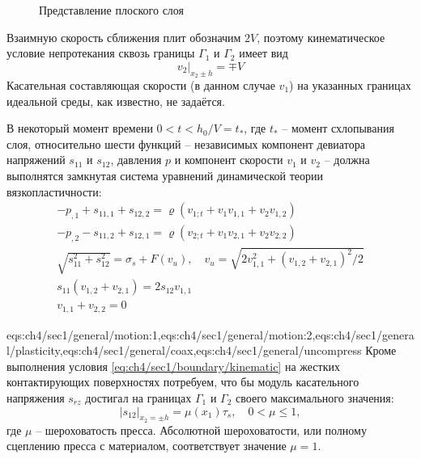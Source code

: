 \begin{figure}[ht]
  \caption{Представление плоского слоя}
  \label{fig:ch4/layer/circle}
\end{figure}
Взаимную скорость сближения плит обозначим $2V$, поэтому кинематическое условие непротекания сквозь границы $\Gamma_{1}$ и $\Gamma_{2}$ имеет вид
\begin{equation}
  \label{eq:ch4/sec1/boundary/kinematic}
  v_{2}\lvert_{x_2\pm h} = \mp V
\end{equation}
Касательная составляющая скорости (в данном случае $v_{1}$) на указанных границах идеальной среды, как известно, не задаётся.

В некоторый момент времени $0 < t < h_{0}/V = t_*$, где $t_*$ -- момент схлопывания слоя, относительно шести функций -- независимых компонент девиатора напряжений $s_{11}$ и $s_{12}$, давления $p$ и компонент скорости $v_{1}$ и $v_{2}$ -- должна выполнятся замкнутая система уравнений динамической теории вязкопластичности:
\begin{gather}
  \label{eqs:ch4/sec1/general/motion:1}
  -p_{,1}+s_{11,1}+s_{12,2} = \varrho \left(v_{1;t}+v_{1} v_{1,1} + v_{2} v_{1,2} \right)
  \\
  \label{eqs:ch4/sec1/general/motion:2}
  -p_{,2}-s_{11,2}+s_{12,1} = \varrho \left(v_{2;t}+v_{1} v_{2,1} + v_{2} v_{2,2} \right)
  \\
  \label{eqs:ch4/sec1/general/plasticity}
  \sqrt{s^2_{11}+s^2_{12}}=\sigma_{s} + F(v_{u}), \quad v_{u} = \sqrt{2 v^2_{1,1}+\left(v_{1,2}+v_{2,1}\right)^2 / 2}
  \\
  \label{eqs:ch4/sec1/general/coax}
  s_{11} \left(v_{1,2}+v_{2,1}\right) = 2 s_{12} v_{1,1}
  \\
  \label{eqs:ch4/sec1/general/uncompress}
  v_{1,1}+v_{2,2} = 0
\end{gather}

\expandafter\gdef\csname eqs:ch4/sec1/general\endcsname{eqs:ch4/sec1/general/motion:1,eqs:ch4/sec1/general/motion:2,eqs:ch4/sec1/general/plasticity,eqs:ch4/sec1/general/coax,eqs:ch4/sec1/general/uncompress}
Кроме выполнения условия \cref{eq:ch4/sec1/boundary/kinematic} на жестких контактирующих поверхностях потребуем, что бы модуль касательного напряжения $s_{rz}$ достигал на границах $\Gamma_{1}$ и $\Gamma_{2}$ своего максимального значения:
\begin{equation}
  \label{eq:ch4/sec1/boundary/force}
  \lvert s_{12}\lvert_{x_2=\pm h} = \mu(x_1) \tau_{s}, \quad 0 < \mu \le 1,
\end{equation}
где $\mu$ -- шероховатость пресса. Абсолютной шероховатости, или полному сцеплению пресса с материалом, соответствует значение $\mu = 1$.

